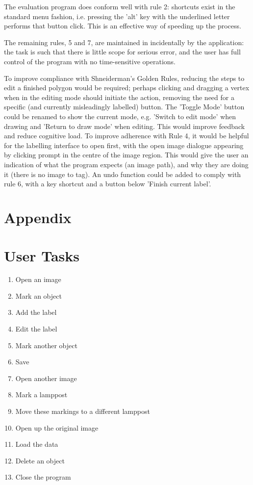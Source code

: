 \documentclass[a4paper,11pt,oneside]{article}
\begin{document}
The evaluation program does conform well with rule 2: shortcuts exist in the standard menu fashion, i.e. pressing the 'alt' key with the underlined letter performs that button click. This is an effective way of speeding up the process.

The remaining rules, 5 and 7, are maintained in incidentally by the application: the task is such that there is little scope for serious error, and the user has full control of the program with no time-sensitive operations.

To improve compliance with Shneiderman's Golden Rules, reducing the steps to edit a finished polygon would be required; perhaps clicking and dragging a vertex when in the editing mode should initiate the action, removing the need for a specific (and currently misleadingly labelled) button. The 'Toggle Mode' button could be renamed to show the current mode, e.g. 'Switch to edit mode' when drawing and 'Return to draw mode' when editing. This would improve feedback and reduce cognitive load. To improve adherence with Rule 4, it would be helpful for the labelling interface to open first, with the open image dialogue appearing by clicking prompt in the centre of the image region. This would give the user an indication of what the program expects (an image path), and why they are doing it (there is no image to tag). An undo function could be added to comply with rule 6, with a key shortcut and a button below 'Finish current label'.

\newpage
\section{Appendix}
\appendix

\section{User Tasks}
\label{sec:tasks}

\begin{enumerate}
\item Open an image
\item Mark an object
\item Add the label
\item Edit the label
\item Mark another object
\item Save
\item Open another image
\item Mark a lamppost
\item Move these markings to a different lamppost
\item Open up the original image
\item Load the data
\item Delete an object
\item Close the program
\end{enumerate}
\end{document}
